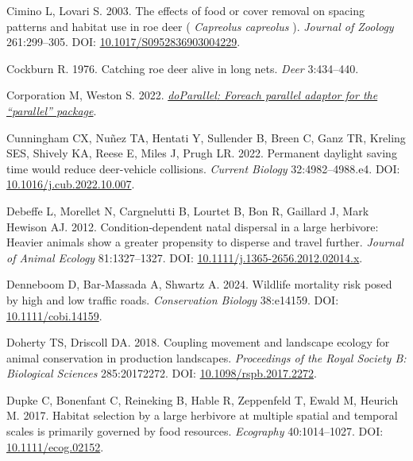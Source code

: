 \documentclass[10pt,a4paper]{article}
\newlength{\cslhangindent}
\newenvironment{CSLReferences}[2] %
 {\begin{list}{}{%
  \setlength{\itemindent}{0pt}
  \setlength{\leftmargin}{0pt}
  \setlength{\parsep}{0pt}
  \ifodd #1
   \setlength{\leftmargin}{\cslhangindent}
   \setlength{\itemindent}{-1\cslhangindent}
  \fi
  \setlength{\itemsep}{#2\baselineskip}}}
 {\end{list}}
\begin{document}
\begin{CSLReferences}{1}{0}
Cimino L, Lovari S. 2003. The effects of food or cover removal on spacing patterns and habitat use in roe deer ( \emph{{Capreolus} capreolus} ). \emph{Journal of Zoology} 261:299--305. DOI: \href{https://doi.org/10.1017/S0952836903004229}{10.1017/S0952836903004229}.

Cockburn R. 1976. Catching roe deer alive in long nets. \emph{Deer} 3:434--440.

Corporation M, Weston S. 2022. \emph{\href{https://CRAN.R-project.org/package=doParallel}{{doParallel}: Foreach parallel adaptor for the {``{parallel}''} package}}.

Cunningham CX, Nuñez TA, Hentati Y, Sullender B, Breen C, Ganz TR, Kreling SES, Shively KA, Reese E, Miles J, Prugh LR. 2022. Permanent daylight saving time would reduce deer-vehicle collisions. \emph{Current Biology} 32:4982--4988.e4. DOI: \href{https://doi.org/10.1016/j.cub.2022.10.007}{10.1016/j.cub.2022.10.007}.

Debeffe L, Morellet N, Cargnelutti B, Lourtet B, Bon R, Gaillard J, Mark Hewison AJ. 2012. Condition‐dependent natal dispersal in a large herbivore: Heavier animals show a greater propensity to disperse and travel further. \emph{Journal of Animal Ecology} 81:1327--1327. DOI: \href{https://doi.org/10.1111/j.1365-2656.2012.02014.x}{10.1111/j.1365-2656.2012.02014.x}.

Denneboom D, Bar‐Massada A, Shwartz A. 2024. Wildlife mortality risk posed by high and low traffic roads. \emph{Conservation Biology} 38:e14159. DOI: \href{https://doi.org/10.1111/cobi.14159}{10.1111/cobi.14159}.

Doherty TS, Driscoll DA. 2018. Coupling movement and landscape ecology for animal conservation in production landscapes. \emph{Proceedings of the Royal Society B: Biological Sciences} 285:20172272. DOI: \href{https://doi.org/10.1098/rspb.2017.2272}{10.1098/rspb.2017.2272}.

Dupke C, Bonenfant C, Reineking B, Hable R, Zeppenfeld T, Ewald M, Heurich M. 2017. Habitat selection by a large herbivore at multiple spatial and temporal scales is primarily governed by food resources. \emph{Ecography} 40:1014--1027. DOI: \href{https://doi.org/10.1111/ecog.02152}{10.1111/ecog.02152}.


\end{CSLReferences}
\end{document}
